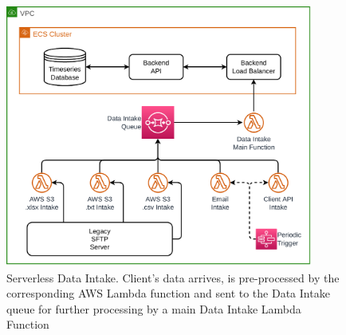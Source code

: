 \begin{figure}[!htbp]
    \centering
    \includegraphics[width=0.90\textwidth]{img/diagrams/pdf/data-intake.drawio.pdf}
    \caption[Serverless Data Intake]{Serverless Data Intake. Client's data arrives, is pre-processed by the corresponding AWS Lambda function and sent to the Data Intake queue for further processing by a main Data Intake Lambda Function}
    \label{fig:data-intake}
\end{figure}
